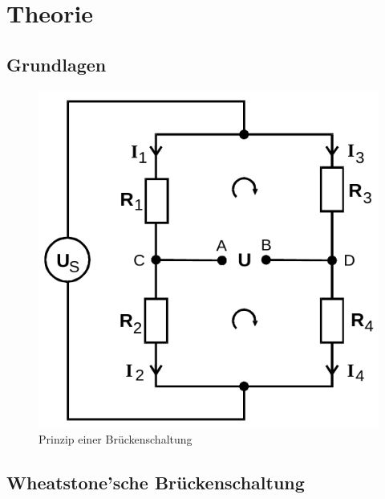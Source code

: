 \section{Theorie}
\label{sec:Theorie}

\subsection{Grundlagen}                      
\label{sec:grundlagen}

\begin{figure}[H]
    \centering
    \includegraphics[scale=0.4]{pictures/1-allg.png}
    \caption{Prinzip einer Brückenschaltung}
    \label{fig:allg}
\end{figure}

\subsection{Wheatstone'sche Brückenschaltung}
\label{sec:wheatstone}

